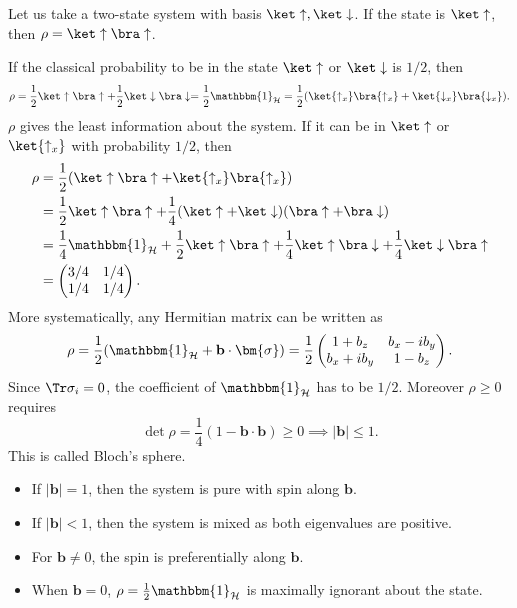 \documentclass[12pt]{article}
\begin{document}
\begin{exbox}
	Let us take a two-state system with basis $\ket \uparrow, \ket \downarrow$. If the state is $\ket \uparrow$, then $\rho = \ket \uparrow \bra \uparrow$.

	If the classical probability to be in the state $\ket \uparrow$ or $\ket \downarrow$ is $1/2$, then
	\[
		\rho = \frac{1}{2} \ket \uparrow \bra \uparrow + \frac{1}{2} \ket \downarrow \bra \downarrow = \frac{1}{2} \mathbbm{1}_{\mathcal{H}} = \frac{1}{2}(\ket{\uparrow_x} \bra{\uparrow_x} + \ket{\downarrow_x} \bra{\downarrow_x}).
	\]
	$\rho$ gives the least information about the system. If it can be in $\ket \uparrow$ or $\ket{\uparrow_x}$ with probability $1/2$, then
	\begin{align*}
		\rho &= \frac{1}{2} ( \ket \uparrow \bra \uparrow + \ket{\uparrow_x} \bra{\uparrow_x}) \\
		     &= \frac{1}{2} \ket \uparrow \bra \uparrow + \frac{1}{4}(\ket \uparrow + \ket \downarrow)(\bra \uparrow + \bra \downarrow) \\
		     &= \frac{1}{4} \mathbbm{1}_{\mathcal{H}} + \frac{1}{2} \ket \uparrow \bra \uparrow + \frac{1}{4} \ket \uparrow \bra \downarrow + \frac{1}{4} \ket \downarrow \bra \uparrow \\
		     &=
		     \begin{pmatrix}
			     3/4 & 1/4 \\
			     1/4 & 1/4
		     \end{pmatrix}.
	\end{align*}
	More systematically, any Hermitian matrix can be written as
	\[
	\rho = \frac{1}{2}(\mathbbm{1}_{\mathcal{H}} + \mathbf{b} \cdot \bm{\sigma}) = \frac{1}{2}
	\begin{pmatrix}
		1 + b_z & b_x - i b_y \\
		b_x + i b_y & 1 - b_z
	\end{pmatrix}.
	\]
	Since $\Tr \sigma_i = 0$, the coefficient of $\mathbbm{1}_{\mathcal{H}}$ has to be $1/2$. Moreover $\rho \geq 0$ requires
	\[
	\det \rho = \frac{1}{4}(1 - \mathbf{b} \cdot \mathbf{b}) \geq 0 \implies |\mathbf{b}| \leq 1.
	\]
	This is called Bloch's sphere.
	\begin{itemize}
		\item If $|\mathbf{b}| = 1$, then the system is pure with spin along $\mathbf{b}$.
		\item If $|\mathbf{b}| < 1$, then the system is mixed as both eigenvalues are positive.
		\item For $\mathbf{b} \neq 0$, the spin is preferentially along $\mathbf{b}$.
		\item When $\mathbf{b} = 0$, $\rho = \frac{1}{2} \mathbbm{1}_{\mathcal{H}}$ is maximally ignorant about the state.
	\end{itemize}
\end{exbox}
\end{document}
